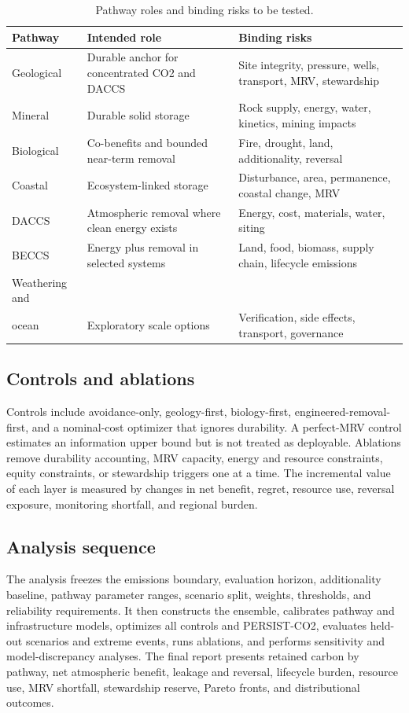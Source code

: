 \documentclass[conference]{IEEEtran}
\begin{document}
\begin{table}[t]
\centering
\caption{Pathway roles and binding risks to be tested.}
\label{tab:pathways}
\footnotesize
\begin{tabular}{P{1.55cm}P{2.1cm}P{2.5cm}}
\toprule
Pathway & Intended role & Binding risks \\
\midrule
Geological & Durable anchor for concentrated CO2 and DACCS & Site integrity, pressure, wells, transport, MRV, stewardship \\
Mineral & Durable solid storage & Rock supply, energy, water, kinetics, mining impacts \\
Biological & Co-benefits and bounded near-term removal & Fire, drought, land, additionality, reversal \\
Coastal & Ecosystem-linked storage & Disturbance, area, permanence, coastal change, MRV \\
DACCS & Atmospheric removal where clean energy exists & Energy, cost, materials, water, siting \\
BECCS & Energy plus removal in selected systems & Land, food, biomass, supply chain, lifecycle emissions \\
Weathering and\\ ocean & Exploratory scale options & Verification, side effects, transport, governance \\
\bottomrule
\end{tabular}
\end{table}

\subsection{Controls and ablations}
Controls include avoidance-only, geology-first, biology-first, engineered-removal-first, and a nominal-cost optimizer that ignores durability. A perfect-MRV control estimates an information upper bound but is not treated as deployable. Ablations remove durability accounting, MRV capacity, energy and resource constraints, equity constraints, or stewardship triggers one at a time. The incremental value of each layer is measured by changes in net benefit, regret, resource use, reversal exposure, monitoring shortfall, and regional burden.

\subsection{Analysis sequence}
The analysis freezes the emissions boundary, evaluation horizon, additionality baseline, pathway parameter ranges, scenario split, weights, thresholds, and reliability requirements. It then constructs the ensemble, calibrates pathway and infrastructure models, optimizes all controls and PERSIST-CO2, evaluates held-out scenarios and extreme events, runs ablations, and performs sensitivity and model-discrepancy analyses. The final report presents retained carbon by pathway, net atmospheric benefit, leakage and reversal, lifecycle burden, resource use, MRV shortfall, stewardship reserve, Pareto fronts, and distributional outcomes.
\end{document}
